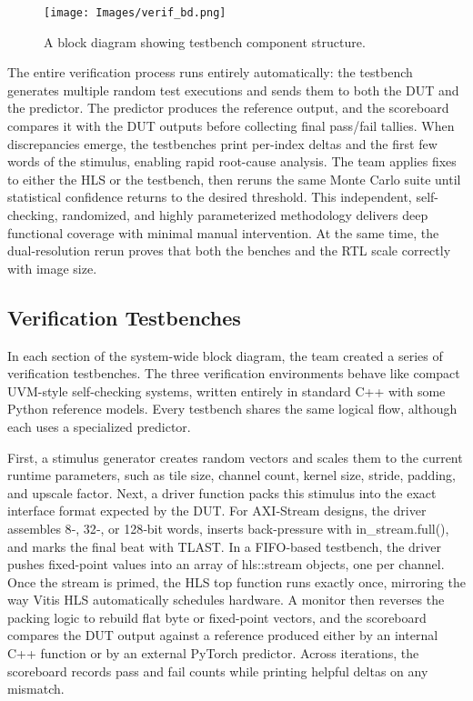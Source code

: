 \documentclass{article}
\begin{document}
    \begin{figure}[!tb] 
        \centering
        \texttt{[image: Images/verif\_bd.png]} 
        \caption{A block diagram showing testbench component structure.} 
        \label{fig:verif_bd} 
    \end{figure}

    \par The entire verification process runs entirely automatically: the testbench generates multiple random test executions and sends them to both the DUT and the predictor. The predictor produces the reference output, and the scoreboard compares it with the DUT outputs before collecting final pass/fail tallies. When discrepancies emerge, the testbenches print per-index deltas and the first few words of the stimulus, enabling rapid root-cause analysis. The team applies fixes to either the HLS or the testbench, then reruns the same Monte Carlo suite until statistical confidence returns to the desired threshold. This independent, self-checking, randomized, and highly parameterized methodology delivers deep functional coverage with minimal manual intervention. At the same time, the dual-resolution rerun proves that both the benches and the RTL scale correctly with image size.

    \subsection{Verification Testbenches}
    \noindent In each section of the system-wide block diagram, the team created a series of verification testbenches. The three verification environments behave like compact UVM-style self-checking systems, written entirely in standard C++ with some Python reference models. Every testbench shares the same logical flow, although each uses a specialized predictor.

    \par First, a stimulus generator creates random vectors and scales them to the current runtime parameters, such as tile size, channel count, kernel size, stride, padding, and upscale factor. Next, a driver function packs this stimulus into the exact interface format expected by the DUT. For AXI‑Stream designs, the driver assembles 8‑, 32‑, or 128‑bit words, inserts back-pressure with in\_stream.full(), and marks the final beat with TLAST. In a FIFO‑based testbench, the driver pushes fixed-point values into an array of hls::stream objects, one per channel. Once the stream is primed, the HLS top function runs exactly once, mirroring the way Vitis HLS automatically schedules hardware. A monitor then reverses the packing logic to rebuild flat byte or fixed-point vectors, and the scoreboard compares the DUT output against a reference produced either by an internal C++ function or by an external PyTorch predictor. Across iterations, the scoreboard records pass and fail counts while printing helpful deltas on any mismatch.
\end{document}
